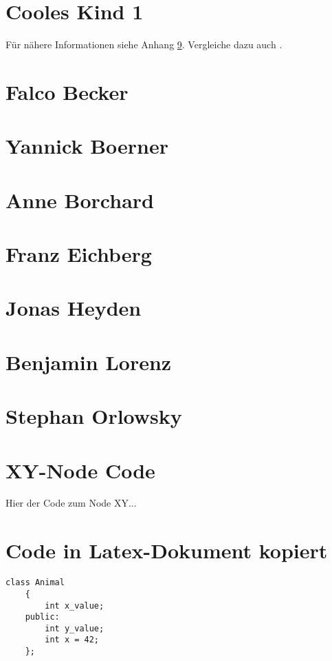 \documentclass[a4paper, 12pt, titlepage]{scrartcl}
\begin{document}
{	\section{Cooles Kind 1}
		Für nähere Informationen siehe Anhang \ref{appendix:xynode}. Vergleiche dazu auch \cite{ibm}.
	\section{Falco Becker}
	\section{Yannick Boerner}
	\section{Anne Borchard}
	\section{Franz Eichberg}
	\section{Jonas Heyden}
	\section{Benjamin Lorenz}
	\section{Stephan Orlowsky}
	
\newpage
\printbibliography

%
\renewcommand\appendixtocname{Anhang} %
\renewcommand\appendixpagename{Anhang}
\renewcommand\appendixname{Anhang}

\newpage
\begin{appendices}

\section{XY-Node Code}
\label{appendix:xynode}
	Hier der Code zum Node XY...

\section{Code in Latex-Dokument kopiert}
\label{appendix:abcnode}  
	\begin{lstlisting}[style=customcpp]
	class Animal 
	{
		int x_value;
	public:
		int y_value;
		int x = 42;
	};
	

\end{lstlisting}
\end{appendices}}
\end{document}

